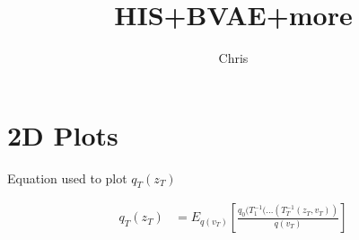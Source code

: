 \documentclass{article}
\begin{document}
\title{HIS+BVAE+more}

\author{Chris}

\maketitle


\section{2D Plots}


Equation used to plot $q_{T}(z_{T})$

\begin{align}
    q_{T}(z_{T}) &= E_{q(v_T)} \left[ \frac {q_{0}(T_{1}^{-1}(...(T_{T}^{-1}(z_{T},v_{T}))} { q(v_{T})}  \right ]
\end{align}
\end{document}
